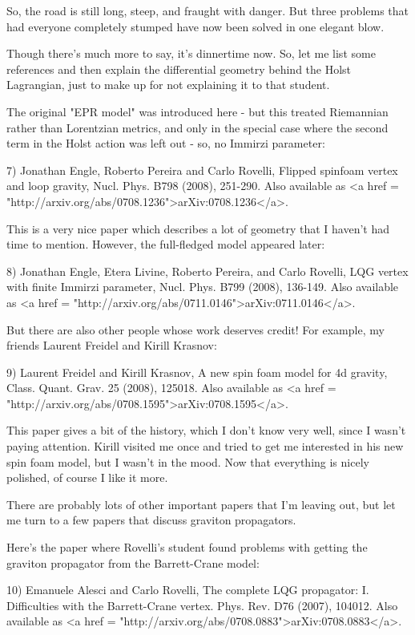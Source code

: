 So, the road is still long, steep, and fraught with danger.  But 
three problems that had everyone completely stumped have now been
solved in one elegant blow.

Though there's much more to say, it's dinnertime now.  So, let me list
some references and then explain the differential geometry behind the
Holst Lagrangian, just to make up for not explaining it to that
student.

The original "EPR model" was introduced here - but this
treated Riemannian rather than Lorentzian metrics, and only in the
special case where the second term in the Holst action was left out -
so, no Immirzi parameter:

7) Jonathan Engle, Roberto Pereira and Carlo Rovelli, Flipped spinfoam
vertex and loop gravity, Nucl. Phys. B798 (2008), 251-290.  Also
available as <a href = "http://arxiv.org/abs/0708.1236">arXiv:0708.1236</a>.

This is a very nice paper which describes a lot of geometry that
I haven't had time to mention.  However, the full-fledged model
appeared later:

8) Jonathan Engle, Etera Livine, Roberto Pereira, and Carlo Rovelli,
LQG vertex with finite Immirzi parameter, Nucl. Phys.  B799 (2008),
136-149.  Also available as <a href =
"http://arxiv.org/abs/0711.0146">arXiv:0711.0146</a>.

But there are also other people whose work deserves credit!  For
example, my friends Laurent Freidel and Kirill Krasnov:

9) Laurent Freidel and Kirill Krasnov, A new spin foam model for 4d
gravity, Class. Quant. Grav. 25 (2008), 125018.  Also available as
<a href = "http://arxiv.org/abs/0708.1595">arXiv:0708.1595</a>.

This paper gives a bit of the history, which I don't know very well,
since I wasn't paying attention.  Kirill visited me once and tried to
get me interested in his new spin foam model, but I wasn't in the
mood.  Now that everything is nicely polished, of course I like it
more.

There are probably lots of other important papers that I'm leaving
out, but let me turn to a few papers that discuss graviton
propagators.

Here's the paper where Rovelli's student found problems with
getting the graviton propagator from the Barrett-Crane model:

10) Emanuele Alesci and Carlo Rovelli, The complete LQG propagator:
I. Difficulties with the Barrett-Crane vertex.  Phys. Rev. D76 (2007),
104012.  Also available as <a href = "http://arxiv.org/abs/0708.0883">arXiv:0708.0883</a>.

